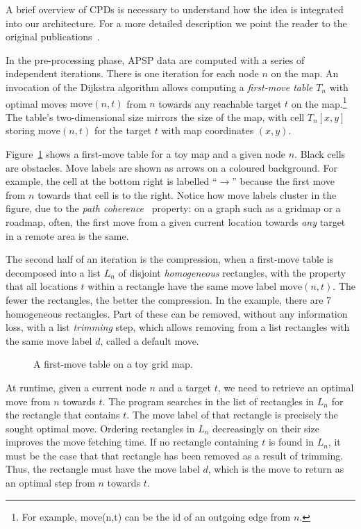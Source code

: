 \documentclass[runningheads,a4paper]{llncs}
\begin{document}
A brief overview of CPDs is necessary to understand how the idea is integrated
into our architecture. For a more detailed description we point the reader to
the original publications~\cite{botea11,DBLP:conf/socs/Botea12}.

In the pre-processing phase, APSP data are computed with a series of independent
iterations. There is one iteration for each node $n$ on the map.
An invocation of the Dijkstra algorithm allows computing a \emph{first-move
table} $T_n$ with optimal moves $\mbox{move}(n,t)$ from $n$ towards
any reachable target $t$ on the map.\footnote{For example,
\mbox{move}(n,t) can be the id of an outgoing edge from $n$.}
The table's two-dimensional size mirrors the size of the map, 
with cell $T_n[x,y]$ storing $\mbox{move}(n,t)$ for the target $t$ with map
coordinates $(x,y)$.

Figure~\ref{figure-first-move-table} shows a first-move table for a toy map and
a given node $n$. Black cells are obstacles. Move labels are shown as arrows on
a coloured background.
For example, the cell at the bottom right is labelled
``$\rightarrow$'' because the first move from $n$ towards that cell is to the right.
Notice how move labels cluster in the figure, due to the \emph{path
coherence}~\cite{Sankaranarayanan:2005} property: on a graph such as a gridmap
or a roadmap, often, the first move from a given current location towards
\emph{any} target in a remote area is the same.

The second half of an iteration is the compression, when
a first-move table is decomposed into a list $L_n$ of disjoint
\emph{homogeneous} rectangles, with the property that all locations $t$ within a rectangle have
the same move label $\mbox{move}(n,t)$. The fewer the rectangles, the better
the compression. In the example, there are 7 homogeneous rectangles.
Part of these can be removed, without any information loss, with a
list \emph{trimming} step, which allows removing from a list
rectangles with the same move label $d$, called a default move.

\begin{figure}
\begin{center}

\caption{A first-move table on a toy grid map.}
\label{figure-first-move-table}
\end{center}
\vspace{-15pt}
\end{figure}

At runtime, given a current node $n$ and a target $t$, we need to retrieve an
optimal move from $n$ towards $t$. The program searches in the list of
rectangles in $L_n$ for the rectangle that contains $t$. The move label of that rectangle is
precisely the sought optimal move. Ordering rectangles in $L_n$ decreasingly on
their size improves the move fetching time. If no rectangle containing $t$ is
found in $L_n$, it must be the case that that rectangle has been removed
as a result of trimming. Thus, the rectangle must have the move label $d$, which
is the move to return as an optimal step from $n$ towards $t$.
\end{document}
